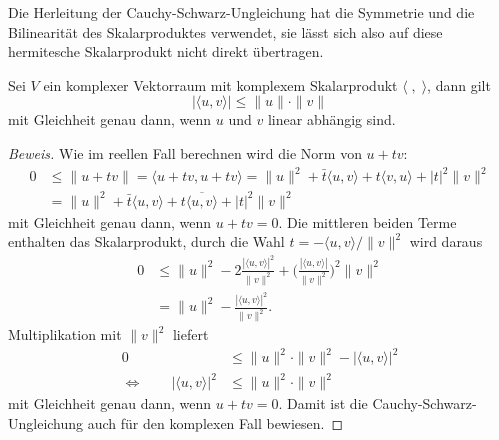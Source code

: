 Die Herleitung der Cauchy-Schwarz-Ungleichung hat die Symmetrie
und die Bilinearität des Skalarproduktes verwendet, sie lässt sich
also auf diese hermitesche Skalarprodukt nicht direkt übertragen.

\begin{satz}
Sei $V$ ein komplexer Vektorraum mit komplexem Skalarprodukt
$\langle\;,\;\rangle$,
dann gilt
\[
|\langle u,v\rangle| \le \|u\|\cdot \|v\|
\]
mit Gleichheit genau dann, wenn $u$ und $v$ linear abhängig sind.
\end{satz}

\begin{proof}[Beweis]
Wie im reellen Fall berechnen wird die Norm von $u+tv$:
\begin{align*}
0&\le
\| u+tv\|=\langle u+tv,u+tv\rangle
=
\|u\|^2 + \bar{t}\langle u,v\rangle + t\langle v,u\rangle + |t|^2 \|v\|^2
\\
&=
\|u\|^2 + \bar{t}\langle u,v\rangle + t\overline{\langle u,v\rangle} + |t|^2 \|v\|^2
\end{align*}
mit Gleichheit genau dann, wenn $u+tv=0$.
Die mittleren beiden Terme enthalten das Skalarprodukt, durch die Wahl
$t=-\langle u,v\rangle/\|v\|^2$ wird daraus
\begin{align*}
0
&\le
\|u\|^2 - 2\frac{|\langle u,v\rangle|^2}{\|v\|^2}
+
\biggl(\frac{|\langle u,v\rangle|}{\|v\|^2}\biggr)^2\|v\|^2
\\
&=
\|u\|^2 - \frac{|\langle u,v\rangle|^2}{\|v\|^2}.
\end{align*}
Multiplikation mit $\|v\|^2$ liefert
\begin{align*}
0&\le \|u\|^2 \cdot \|v\|^2 - |\langle u,v\rangle|^2
\\
\Leftrightarrow
\qquad
|\langle u,v\rangle|^2
&\le \|u\|^2 \cdot \|v\|^2
\end{align*}
mit Gleichheit genau dann, wenn $u+tv=0$.
Damit ist die Cauchy-Schwarz-Ungleichung auch für den komplexen Fall bewiesen.
\end{proof}

